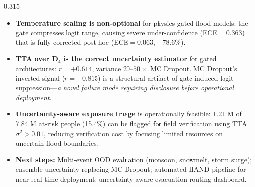 \documentclass[final]{beamer}
\begin{document}
\begin{frame}[t,fragile]{}
\begin{columns}[T]
\begin{column}{0.315\textwidth}
\begin{minipage}{0.93\textwidth}
\begin{tcolorbox}[findingbox]
\begin{itemize}[leftmargin=1.4em,itemsep=4pt,topsep=2pt]
  \item[\color{successGreen}\large\textbf{2.}]
    \textbf{Temperature scaling is non-optional} for physics-gated flood models:
    the gate compresses logit range, causing severe under-confidence (ECE$=0.363$)
    that is fully corrected post-hoc (ECE$=0.063$, $-78.6\%$).

  \item[\color{successGreen}\large\textbf{3.}]
    \textbf{TTA over D$_4$ is the correct uncertainty estimator} for gated
    architectures: $r{=}+0.614$, variance $20{\text{–}}50\times$ MC Dropout.
    MC Dropout's inverted signal ($r{=}{-}0.815$) is a structural artifact of
    gate-induced logit suppression—\textit{a novel failure mode requiring
    disclosure before operational deployment}.

  \item[\color{dkuGold}\large\textbf{4.}]
    \textbf{Uncertainty-aware exposure triage} is operationally feasible:
    1.21 M of 7.84 M at-risk people (15.4\%) can be flagged for field
    verification using TTA $\sigma^2 > 0.01$, reducing verification cost by
    focusing limited resources on uncertain flood boundaries.

  \item[\color{highlightBlue}\large\textbf{5.}]
    \textbf{Next steps:} Multi-event OOD evaluation (monsoon, snowmelt, storm
    surge); ensemble uncertainty replacing MC Dropout; automated HAND pipeline
    for near-real-time deployment; uncertainty-aware evacuation routing dashboard.
\end{itemize}
\end{tcolorbox}

\vspace{10pt}


\end{minipage}
\end{column}
\end{columns}
\end{frame}
\end{document}
